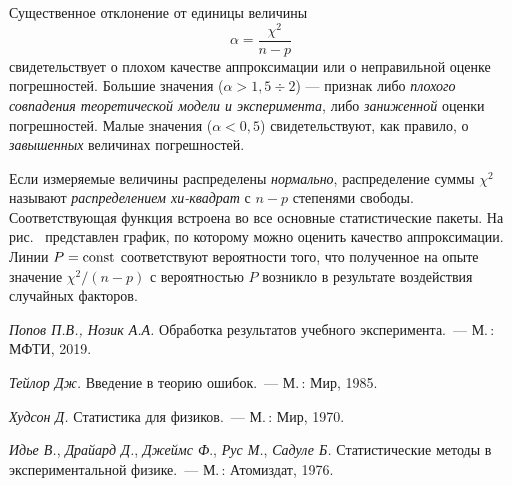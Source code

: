 \begin{booksupplement}
\begin{description}[font=\mdseries\sffamily]
    Существенное отклонение от единицы величины 
    \[
     \alpha = \frac{\chi^2}{n-p}
    \] 
    свидетельствует о плохом качестве аппроксимации или о неправильной оценке погрешностей.
    Большие значения ($\alpha >1,5 \div 2$) --- признак либо \emph{плохого совпадения теоретической
    модели и эксперимента}, либо \emph{заниженной} оценки погрешностей.
    Малые значения ($\alpha <0,5$) свидетельствуют, как правило, о
    \emph{завышенных} величинах погрешностей.
    
    Если измеряемые величины распределены \emph{нормально}, распределение суммы
    $\chi^2$ называют \emph{распределением хи-квадрат} с $n-p$ степенями
    свободы. Соответствующая функция встроена во все основные 
    статистические пакеты. На рис.~ представлен график, 
    по которому     можно оценить качество аппроксимации. Линии 
    $P=\mathrm{const}$ соответствуют вероятности того, что 
    полученное на опыте значение $\chi^2/(n-p)$ с вероятностью $P$ 
    возникло в результате воздействия случайных факторов.
  
    
\end{description}

\begin{lab:literature}
    \item \textit{Попов П.В., Нозик А.А.} Обработка результатов
    учебного эксперимента.~--- М.\,: МФТИ, 2019.

    \item \textit{Тейлор Дж.} Введение в теорию ошибок.~---
    М.\,: Мир, 1985.
%    
%    
    
    \item \textit{Худсон Д.} Статистика для физиков.~---
    М.\,: Мир, 1970.
    
    \item \textit{Идье В.}, \textit{Драйард Д.}, \textit{Джеймс Ф}., \textit{Рус М.}, \textit{Садуле Б.} 
    Статистические методы в экспериментальной физике.~---
    М.\,: Атомиздат, 1976. 
\end{lab:literature}

\end{booksupplement}